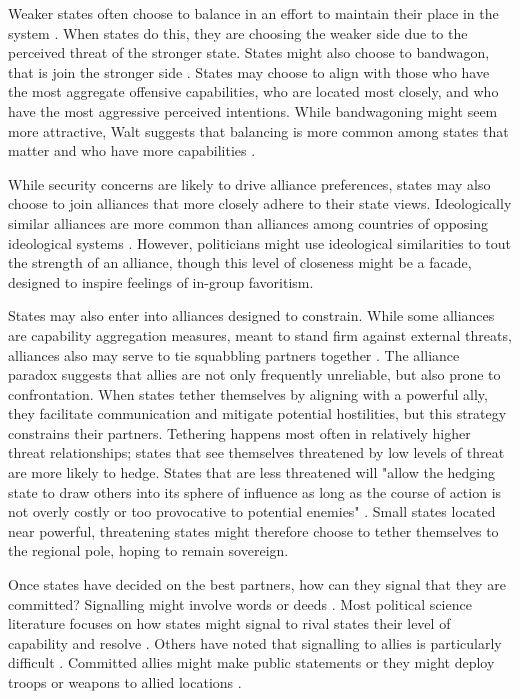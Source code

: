 \documentclass[12pt]{article}
\begin{document}
Weaker states often choose to balance in an effort to maintain their place in the system \citep{waltz_theory_2010}. When states do this, they are choosing the weaker side due to the perceived threat of the stronger state. States might also choose to bandwagon, that is join the stronger side \citep{waltz_theory_2010, walt_origins_2007}. States may choose to align with those who have the most aggregate offensive capabilities, who are located most closely, and who have the most aggressive perceived intentions. While bandwagoning might seem more attractive, Walt suggests that balancing is more common among states that matter and who have more capabilities \citep{walt_origins_2007}. 

While security concerns are likely to drive alliance preferences, states may also choose to join alliances that more closely adhere to their state views. Ideologically similar alliances are more common than alliances among countries of opposing ideological systems \citep{walt_origins_2007}. However, politicians might use ideological similarities to tout the strength of an alliance, though this level of closeness might be a facade, designed to inspire feelings of in-group favoritism. 

States may also enter into alliances designed to constrain. While some alliances are capability aggregation measures, meant to stand firm against external threats, alliances also may serve to tie squabbling partners together \citep{weitsman_dangerous_2004}. The alliance paradox suggests that allies are not only frequently unreliable, but also prone to confrontation. When states tether themselves by aligning with a powerful ally, they facilitate communication and mitigate potential hostilities, but this strategy constrains their partners. Tethering happens most often in relatively higher threat relationships; states that see themselves threatened by low levels of threat are more likely to hedge. States that are less threatened will "allow the hedging state to draw others into its sphere of influence as long as the course of action is not overly costly or too provocative to potential enemies" \citep{weitsman_dangerous_2004}. Small states located near powerful, threatening states might therefore choose to tether themselves to the regional pole, hoping to remain sovereign. 

Once states have decided on the best partners, how can they signal that they are committed? Signalling might involve words or deeds \citep{fuhrmann_signaling_2014}. Most political science literature focuses on how states might signal to rival states their level of capability and resolve \citep{fearon_signaling_1997, kertzer_resolve_2016}. Others have noted that signalling to allies is particularly difficult \citep{schelling_arms_1967}. Committed allies might make public statements or they might deploy troops or weapons to allied locations \citep{fuhrmann_signaling_2014, blankenship_trivial_2022}. 
\end{document}
